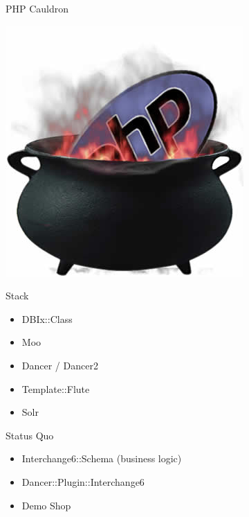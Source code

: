\begin{frame}{PHP Cauldron}
  \begin{center}
    \includegraphics[width=\textwidth,height=0.8\textheight,keepaspectratio]{images/cauldron.jpg}
  \end{center}
\end{frame}

\begin{frame}{Stack}
  \begin{itemize}
  \item DBIx::Class
  \item Moo
  \item Dancer / Dancer2
  \item Template::Flute
  \item Solr
  \end{itemize}
\end{frame}

\begin{frame}{Status Quo}
\begin{itemize}
\item Interchange6::Schema (business logic)
\item Dancer::Plugin::Interchange6
\item Demo Shop
\end{itemize}
\end{frame}

